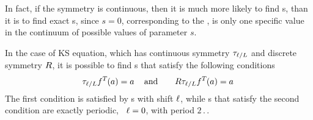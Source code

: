 In fact, if the symmetry is continuous, then it is much more likely
to find \rpo s, than it is to find exact \po s, since $s = 0$,
corresponding to the \po , is only one specific value in the
continuum of possible values of parameter $s$.

In the case of KS equation, which has continuous symmetry
$\tau_{\ell/L}$ and discrete symmetry $R$, it is possible to
find \rpo s that satisfy the following conditions
\[
  \tau_{\ell/L}f^{T_{}}(a) = a\,
\quad\mbox{and}\qquad
  R\tau_{\ell/L}f^{T_{}}(a) = a\,
\]
The first condition is satisfied by \rpo s with shift $\ell$,
while \rpo s that satisfy the second condition are exactly periodic,
\ie\ $\ell = 0$, with period $2\period{}$.
